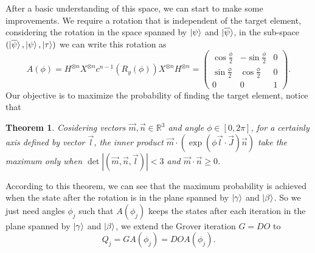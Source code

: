 \documentclass[a4paper,10pt]{book}
\newtheorem{theorem}{Theorem}[section]
\numberwithin{equation}{section}
\begin{document}
After a basic understanding of this space, we can start to make some improvements. We require a rotation that is independent of the target element, considering the rotation in the space spanned by $\ket{\psi}$ and $\ket{\overline{\psi}}$, in the sub-space $(\ket{\overline{\psi}},\ket{\psi},\ket{\tau})$ we can write this rotation as
\begin{equation}
    A(\phi)=H^{\otimes n}X^{\otimes n}c^{n-1}\left(R_{y}(\phi)\right)X^{\otimes n}H^{\otimes n}=
    \begin{pmatrix}
        \cos\frac{\phi}{2} & -\sin\frac{\phi}{2} & 0 \\
        \sin\frac{\phi}{2} & \cos\frac{\phi}{2}  & 0 \\
        0                  & 0                   & 1
    \end{pmatrix}
    .
\end{equation}
Our objective is to maximize the probability of finding the target element, notice that
\begin{theorem}
    Cosidering vectors $\vec{m},\vec{n}\in\mathbb{R}^{3}$ and angle $\phi\in[0,2\pi]$, for a certainly axis defined by vector $\vec{l}$, the inner product $\vec{m}\cdot\left(\exp\left(\phi\vec{l}\cdot\vec{J}\right)\vec{n}\right)$ take the maximum only when $\det\left\lvert\left(\vec{m},\vec{n},\vec{l}\right)\right\rvert<3$ and $\vec{m}\cdot\vec{n}\geq0$.
\end{theorem}
According to this theorem, we can see that the maximum probability is achieved when the state after the rotation is in the plane spanned by $\ket{\gamma}$ and $\ket{\beta}$. So we just need angles $\phi_{j}$ such that $A(\phi_{j})$ keeps the states after each iteration in the plane spanned by $\ket{\gamma}$ and $\ket{\beta}$, we extend the Grover iteration $G=DO$ to
\begin{equation}
    Q_{j}=GA(\phi_{j})=DOA(\phi_{j}).
\end{equation}






\end{document}
